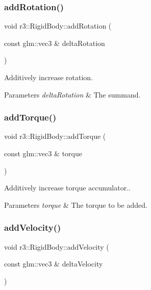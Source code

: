 \subsubsection{\texorpdfstring{add\+Rotation()}{addRotation()}}
{\footnotesize\ttfamily void r3\+::\+Rigid\+Body\+::add\+Rotation (\begin{DoxyParamCaption}\item[{const glm\+::vec3 \&}]{delta\+Rotation }\end{DoxyParamCaption})}



Additively increase rotation. 


\begin{DoxyParams}{Parameters}
{\em delta\+Rotation} & The summand. \\
\hline
\end{DoxyParams}
\mbox{\label{classr3_1_1_rigid_body_a276ac614e4eab3df963d64401112bd36}} 
\subsubsection{\texorpdfstring{add\+Torque()}{addTorque()}}
{\footnotesize\ttfamily void r3\+::\+Rigid\+Body\+::add\+Torque (\begin{DoxyParamCaption}\item[{const glm\+::vec3 \&}]{torque }\end{DoxyParamCaption})}



Additively increase torque accumulator.. 


\begin{DoxyParams}{Parameters}
{\em torque} & The torque to be added. \\
\hline
\end{DoxyParams}
\mbox{\label{classr3_1_1_rigid_body_aa3303f1eb97e56d75562525b5e317937}} 
\subsubsection{\texorpdfstring{add\+Velocity()}{addVelocity()}}
{\footnotesize\ttfamily void r3\+::\+Rigid\+Body\+::add\+Velocity (\begin{DoxyParamCaption}\item[{const glm\+::vec3 \&}]{delta\+Velocity }\end{DoxyParamCaption})}



